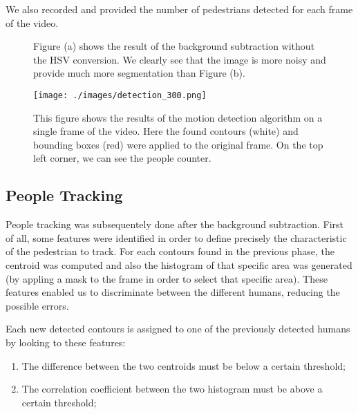 \documentclass[runningheads]{llncs}
\begin{document}
We also recorded and provided the number of pedestrians detected for each frame of the video. 


\begin{figure}
\centering
{}
\hfill
{}
\caption{Figure (a) shows the result of the background subtraction without the HSV conversion. We clearly see that the image
is more noisy and provide much more segmentation than Figure (b).}
\label{object_detection}
\end{figure}

\begin{figure}
\texttt{[image: ./images/detection\_300.png]}
\caption{This figure shows the results of the motion detection algorithm on a single frame of the video. Here the found contours (white) and bounding boxes (red) were applied to the original frame. On the top left corner, we can see the people counter.}
\label{object_detection_result}
\end{figure}

\subsection{People Tracking}

People tracking was subsequentely done after the background subtraction. First of all, some features were identified in order to define precisely
the characteristic of the pedestrian to track. For each contours found in the previous phase, the centroid was computed and also the histogram of
that specific area was generated (by appling a mask to the frame in order to select that specific area). These features enabled us to discriminate
between the different humans, reducing the possible errors. 

Each new detected contours is assigned to one of the previously detected humans by looking to these features:
\begin{enumerate}
\item The difference between the two centroids must be below a certain threshold;
\item The correlation coefficient between the two histogram must be above a certain threshold;
\end{enumerate}
\end{document}
